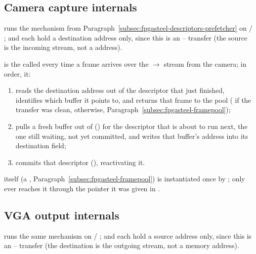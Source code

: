 \subsection{Camera capture internals}
\label{subsec:fpgasteel-camera-capture-interrupt}

 runs the mechanism from Paragraph~\ref{subsec:fpgasteel-descriptors-prefetcher} on  / ;  and  each hold a destination address only, since this is an -- transfer (the source is the incoming  stream, not a  address).

 is the  called every time a frame arrives over the $\rightarrow$ stream from the camera; in order, it:
\begin{enumerate}
    \item reads the destination address out of the descriptor that just finished, identifies which  buffer it points to, and returns that frame to the pool ( if the transfer was clean,  otherwise, Paragraph~\ref{subsec:fpgasteel-framepool});
    \item pulls a fresh buffer out of  () for the descriptor that is about to run next, the one still waiting, not yet committed, and writes that buffer's address into its destination field;
    \item commits that descriptor (), reactivating it.
\end{enumerate}

 itself (a , Paragraph~\ref{subsec:fpgasteel-framepool}) is instantiated once by ;  only ever reaches it through the pointer it was given in .

\subsection{VGA output internals}
\label{subsec:fpgasteel-vga-output-interrupt}

 runs the same mechanism on  / ;  and  each hold a source address only, since this is an -- transfer (the destination is the outgoing  stream, not a memory address).

